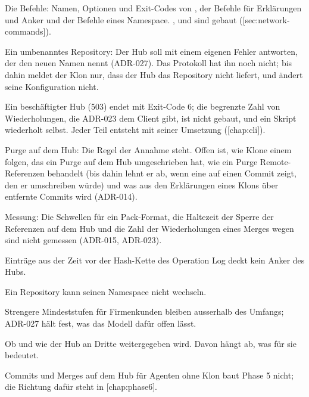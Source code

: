 \startitemize
\item Die Befehle: Namen, Optionen und Exit-Codes von , der Befehle für Erklärungen
und Anker und der Befehle eines Namespace.
,  und  sind gebaut ([sec:network-commands]).
\item Ein umbenanntes Repository: Der Hub soll mit einem eigenen Fehler antworten, der den neuen
Namen nennt (ADR-027). Das Protokoll hat ihn noch nicht; bis dahin meldet der Klon nur, dass der
Hub das Repository nicht liefert, und ändert seine Konfiguration nicht.
\item Ein beschäftigter Hub (503) endet mit Exit-Code 6; die begrenzte Zahl von Wiederholungen,
die ADR-023 dem Client gibt, ist nicht gebaut, und ein Skript wiederholt selbst.
Jeder Teil entsteht mit seiner Umsetzung ([chap:cli]).
\item Purge auf dem Hub: Die Regel der Annahme steht.
Offen ist, wie Klone einem  folgen, das ein Purge auf dem Hub umgeschrieben hat,
wie ein Purge Remote-Referenzen behandelt (bis dahin lehnt er ab, wenn eine auf einen Commit
zeigt, den er umschreiben würde)
und was aus den Erklärungen eines Klons über entfernte Commits wird (ADR-014).
\item Messung: Die Schwellen für ein Pack-Format, die Haltezeit der Sperre der Referenzen auf dem
Hub und die Zahl der Wiederholungen eines Merges wegen  sind nicht gemessen
(ADR-015, ADR-023).
\item Einträge aus der Zeit vor der Hash-Kette des Operation Log deckt kein Anker des Hubs.
\item Ein Repository kann seinen Namespace nicht wechseln.
\item Strengere Mindeststufen für Firmenkunden bleiben ausserhalb des Umfangs; ADR-027 hält fest,
was das Modell dafür offen lässt.
\item Ob und wie der Hub an Dritte weitergegeben wird.
Davon hängt ab, was  für sie bedeutet.
\stopitemize

Commits und Merges auf dem Hub für Agenten ohne Klon baut Phase 5 nicht; die Richtung dafür steht
in [chap:phase6].
